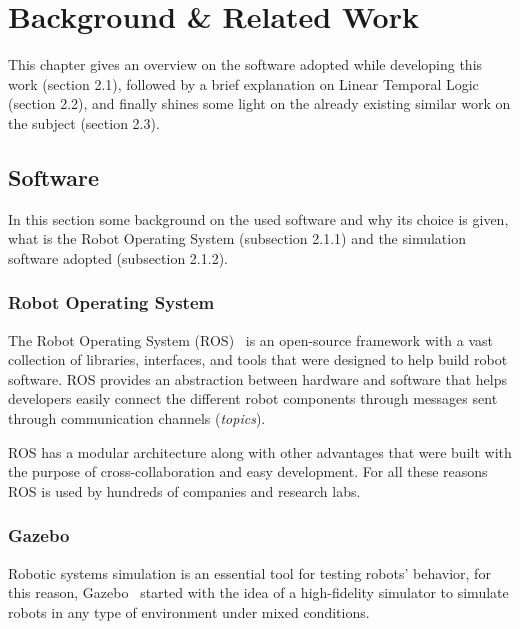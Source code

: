 \chapter{Background \& Related Work}
\label{chap:background}

This chapter gives an overview on the software adopted while developing this work (section 2.1), followed by a brief explanation on Linear Temporal Logic (section 2.2), and finally shines some light on the already existing similar work on the subject (section 2.3).

\section{Software}

In this section some background on the used software and why its choice is given, what is the Robot Operating System (subsection 2.1.1) and the simulation software adopted (subsection 2.1.2).

\subsection{Robot Operating System}
\label{sec:ros}

The Robot Operating System (ROS)~\cite{quigley2009ros} is an open-source framework with a vast collection of libraries, interfaces, and tools that were designed to help build robot software. ROS provides an abstraction between hardware and software that helps developers easily connect the different robot components through messages sent through communication channels (\textit{topics}).

ROS has a modular architecture along with other advantages that were built with the purpose of cross-collaboration and easy development. For all these reasons ROS is used by hundreds of companies and research labs.

\subsection{Gazebo}
\label{sec:gazebo}

Robotic systems simulation is an essential tool for testing robots' behavior, for this reason, Gazebo~\cite{koenig2004design} started with the idea of a high-fidelity simulator to simulate robots in any type of environment under mixed conditions.

